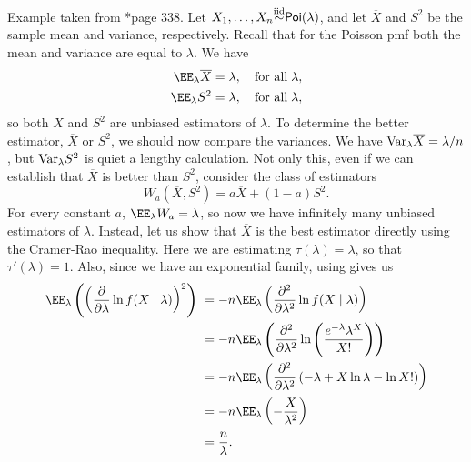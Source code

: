 \begin{exam} \label{exam: poi_unbiased_est}
    Example taken from \cite{CasellaGeorge2001SI}*{page 338}. Let $X_1 , \ldots , X_n {\overset{\text{iid}}{\sim}} {\sf Poi} (\lambda)$, and let $\overline{X}$ and $S^2$ be the sample mean and variance, respectively. Recall that for the Poisson pmf both the mean and variance are equal to $\lambda$. We have
    \begin{align*}
        \EE_{\lambda} \overline{X} & = \lambda, \quad \text{for all} \; \lambda, \\
        \EE_{\lambda} S^2          & = \lambda, \quad \text{for all} \; \lambda,
    \end{align*}
    so both $\overline{X}$ and $S^2$ are unbiased estimators of $\lambda$. To determine the better estimator, $\overline{X}$ or $S^2$, we should now compare the variances. We have ${\operatorname{Var}}_{\lambda} \overline{X} = \lambda / n$, but ${\operatorname{Var}}_{\lambda} S^2$ is quiet a lengthy calculation. Not only this, even if we can establish that $\overline{X}$ is better than $S^2$, consider the class of estimators
    \begin{equation*}
        W_a \left( \overline{X} , S^2 \right) = a \overline{X} + (1-a) S^2.
    \end{equation*}
    For every constant $a$, $\EE_{\lambda} W_a = \lambda$, so now we have infinitely many unbiased estimators of $\lambda$. Instead, let us show that $\overline{X}$ is the best estimator directly using the Cramer-Rao inequality. Here we are estimating $\tau(\lambda) = \lambda$, so that $\tau ' (\lambda) = 1$. Also, since we have an exponential family, using  gives us
    \begin{align*}
        \EE_{\lambda} \left( \left( \frac{\partial}{\partial \lambda} \ln f(X \mid \lambda)  \right)^2 \right) \
         & = - n \EE_{\lambda} \left( \frac{\partial^2}{\partial \lambda^2} \ln f(X \mid \lambda) \right)                                \\
         & = - n \EE_{\lambda} \left( \frac{\partial^2}{\partial \lambda^2} \ln \left( \frac{e^{-\lambda} \lambda^X}{X!} \right) \right) \\
         & = - n \EE_{\lambda} \left( \frac{\partial^2}{\partial \lambda^2} \left( -\lambda + X \ln \lambda - \ln X! \right) \right)     \\
         & = - n \EE_{\lambda} \left( - \frac{X}{\lambda^2} \right)                                                                      \\
         & = \frac{n}{\lambda} .

\end{align*}
\end{exam}
